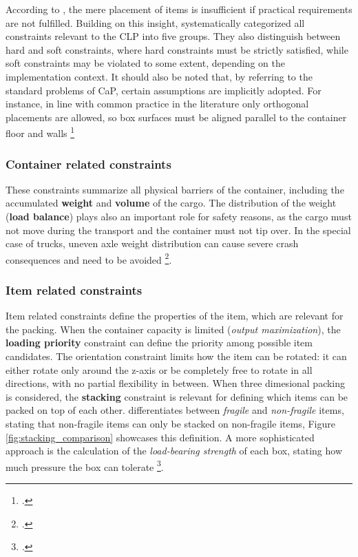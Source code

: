 According to \cite{bischoff_issues_1995}, the mere placement of items is insufficient
if practical requirements are not fulfilled. Building on this insight,
\cite{bortfeldt_constraints_2013} systematically categorized all constraints relevant
to the \gls{CLP} into five groups. They also distinguish between hard and soft constraints,
where hard constraints must be strictly satisfied, while soft constraints may be violated
to some extent, depending on the implementation context.
It should also be noted that, by referring to the standard problems of \gls{CaP},
certain assumptions are implicitly adopted. For instance, in line with common
practice in the literature only orthogonal placements are allowed, so box surfaces must be
aligned parallel to the container floor and walls \footcite[cf.][p.2]{bortfeldt_constraints_2013}

\subsubsection{Container related constraints}
These constraints summarize all physical barriers of the container, including
the accumulated \textbf{weight} and \textbf{volume} of the cargo. The distribution of the weight
(\textbf{load balance}) plays also an important role for safety reasons, as the
cargo must not move during the transport and the container must not tip over.
In the special case of trucks, uneven axle weight distribution can cause severe
crash consequences and need to be avoided \footcite[cf.][p.849-850]{krebs_advanced_2021}.

\subsubsection{Item related constraints}
Item related constraints define the properties of the item, which are relevant
for the packing. When the container capacity is limited (\textit{output maximization}),
the \textbf{loading priority} constraint can define the priority among possible
item candidates. The orientation constraint limits how the item
can be rotated: it can either rotate only around the z-axis or be completely
free to rotate in all directions, with no partial flexibility in between.
When three dimesional packing is considered, the \textbf{stacking} constraint
is relevant for defining which items can be packed on top of each other. \cite{gendreau_tabu_2006}
differentiates between \textit{fragile} and \textit{non-fragile} items, stating
that non-fragile items can only be stacked on non-fragile items, Figure \ref{fig:stacking_comparison} showcases
this definition. A more sophisticated approach is the calculation  of the
\textit{load-bearing strength} of each box, stating how much pressure the box
can tolerate \footcite[cf.][p.847-848]{krebs_advanced_2021}.

